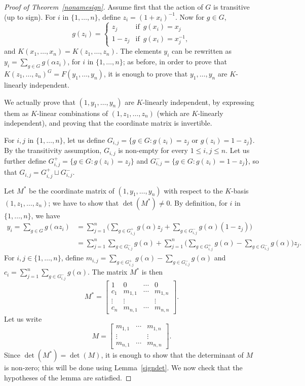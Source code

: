 \documentclass[12pt]{article}
\theoremstyle{plain}
\begin{document}
\begin{proof}[Proof of Theorem~\ref{nonamesign}]
  Assume first that the action of $G$ is transitive (up to sign).
  For $i$ in $\{1,\dots,n\}$, define $z_i = (1+x_i)^{-1} $. Now for $g
  \in G$, $$g(z_i) = \begin{cases} z_j & \text{if} \,\,\, g(x_i) = x_j
    \\ 1-z_j & \text{if} \,\,\, g(x_i) = x_j^{-1},
  \end{cases}$$ 
  and $K(x_1, \ldots , x_n) = K(z_1, \ldots, z_n).$ The elements $y_i$
  can be rewritten as $y_i = \sum_{g \in G} g ({\alpha}z_i)$, for $i$
  in $\{1, \ldots, n\}$; as before, in order to prove that
  $K(z_1,\ldots, z_n)^G = F(y_1, \ldots, y_{n})$, it is enough to
  prove that $y_1,\dots,y_n$ are $K$-linearly independent.

  We actually prove that $(1,y_1,\dots,y_n)$ are $K$-linearly
  independent, by expressing them as $K$-linear combinations of
  $(1,z_1,\dots,z_n)$ (which are $K$-linearly independent), and
  proving that the coordinate matrix is invertible.

  For $i,j$ in $\lbrace 1, \ldots , n \rbrace$, let us define $G_{i,j} =
  \lbrace g \in G : g(z_i) = z_j \,\, \text{or} \,\, g(z_i) = 1-z_j
  \rbrace $. By the transitivity assumption, $G_{i,j}$ is
  non-empty for every $1 \leq i,j \leq n$. Let us further define $G^{+}_{i,j}
  = \lbrace g \in G : g(z_i) = z_j \rbrace$ and $G^{-}_{i,j} =
  \lbrace g \in G : g(z_i) = 1- z_j \rbrace$, so that $G_{i,j}=
  G^{+}_{i,j}\sqcup G^{-}_{i,j}$.  

  Let $M^*$ be the coordinate matrix of $(1, y_1, \ldots,
  y_n)$ with respect to the $K$-basis $(1, z_1, \ldots, z_n)$; 
  we  have to show that $\det (M^*) \neq 0$.
  By definition, for $i$ in $\{1,\dots,n\}$, we have
  \begin{align*}
y_i = \sum_{g \in G} g ({\alpha}z_i)&= \sum_{j=1}^n \Big(\sum_{g\in G^{+}_{i,j}}g(\alpha)z_j +\sum_{g\in G^{-}_{i,j}}g(\alpha)(1-z_j)\Big)\\
&=\sum_{j=1}^n\sum_{g\in G^{-}_{i,j}}g(\alpha)+ \sum_{j=1}^n\Big(\sum_{g\in G^{+}_{i,j}}g(\alpha) -\sum_{g\in G^{-}_{i,j}}g(\alpha)\Big)z_j.
  \end{align*}
For $i,j \in \lbrace1, \ldots , n \rbrace$, define $m_{i,j} =
\sum_{g\in G^{+}_{i,j}}g(\alpha) -\sum_{g\in G^{-}_{i,j}}g(\alpha)$
and $c_i = \sum_{j=1}^n\sum_{g\in G^{-}_{i,j}}g(\alpha)$. The matrix
$M^*$ is then
$$M^* = \begin{bmatrix}
1 & 0 & \cdots & 0\\
c_1 & m_{1,1} & \cdots & m_{1,n}\\
\vdots & \vdots &  & \vdots\\
c_{n} & m_{n,1} & \cdots	& m_{n,n}
\end{bmatrix}.
$$
Let us write
$$M = \begin{bmatrix}
 m_{1,1} & \cdots & m_{1,n}\\
 \vdots &  & \vdots\\
 m_{n,1} & \cdots	& m_{n,n}
\end{bmatrix}.$$
Since $\det(M^*) = \det (M)$, it is enough to show that the
determinant of $M$ is non-zero; this will be done using
Lemma~\ref{signdet}. We now check that the hypotheses of the lemma are
satisfied.


\end{proof}
\end{document}
